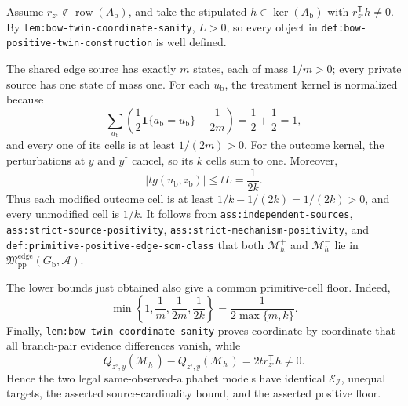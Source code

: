 Assume \(r_{z^{\circ}}\notin\operatorname{row}(A_{\mathrm b})\), and take the stipulated \(h\in\ker(A_{\mathrm b})\) with \(r_{z^{\circ}}^{\mathsf T}h\ne0\).  By \texttt{lem:bow-twin-coordinate-sanity}, \(L>0\), so every object in \texttt{def:bow-positive-twin-construction} is well defined.

The shared edge source has exactly \(m\) states, each of mass \(1/m>0\); every private source has one state of mass one.  For each \(u_{\mathrm b}\), the treatment kernel is normalized because
\[
 \sum_{a_{\mathrm b}}
 \left(\frac12\mathbf 1\{a_{\mathrm b}=u_{\mathrm b}\}
 +\frac{1}{2m}\right)=\frac12+\frac12=1,
\]
and every one of its cells is at least \(1/(2m)>0\).  For the outcome kernel, the perturbations at \(y\) and \(y^{\dagger}\) cancel, so its \(k\) cells sum to one.  Moreover,
\[
 |t g(u_{\mathrm b},z_{\mathrm b})|
 \le tL=\frac{1}{2k}.
\]
Thus each modified outcome cell is at least \(1/k-1/(2k)=1/(2k)>0\), and every unmodified cell is \(1/k\).  It follows from \texttt{ass:independent-sources}, \texttt{ass:strict-source-positivity}, \texttt{ass:strict-mechanism-positivity}, and \texttt{def:primitive-positive-edge-scm-class} that both \(\mathcal M_h^+\) and \(\mathcal M_h^-\) lie in \(\mathfrak M_{\mathrm{pp}}^{\mathrm{edge}}(G_{\mathrm b},\mathcal A)\).

The lower bounds just obtained also give a common primitive-cell floor.  Indeed,
\[
 \min\left\{1,\frac1m,\frac{1}{2m},\frac{1}{2k}\right\}
 =\frac{1}{2\max\{m,k\}}.
\]
Finally, \texttt{lem:bow-twin-coordinate-sanity} proves coordinate by coordinate that all branch-pair evidence differences vanish, while
\[
 Q_{z^{\circ},y}(\mathcal M_h^+)-Q_{z^{\circ},y}(\mathcal M_h^-)
 =2t r_{z^{\circ}}^{\mathsf T}h\ne0.
\]
Hence the two legal same-observed-alphabet models have identical \(\mathcal E_{\mathcal I}\), unequal targets, the asserted source-cardinality bound, and the asserted positive floor.